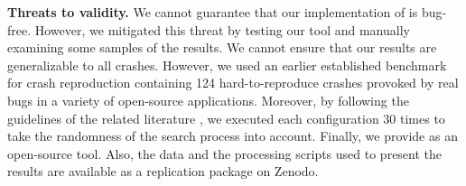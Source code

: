 \textbf{Threats to validity.}
We cannot guarantee that our implementation of \botsing is bug-free. However, we mitigated this threat by testing our tool and manually examining some samples of the results. 
We cannot ensure that our results are generalizable to all crashes. However, we used an earlier established benchmark for crash reproduction containing 124 hard-to-reproduce crashes provoked by real bugs in a variety of open-source applications. 
Moreover, by following the guidelines of the related literature \cite{Arcuri2014}, we executed each configuration 30 times to take the randomness of the search process into account.
Finally, we provide \botsing as an open-source tool. Also, the data and the processing scripts used to present the results are available as a replication package on Zenodo\cite{derakhshanfar_pouria_2020_3953519}.
